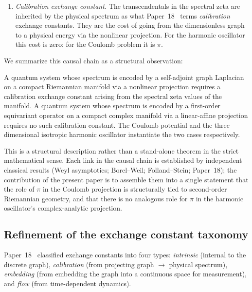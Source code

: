 \documentclass[twocolumn,pra,amsmath,amssymb,superscriptaddress]{revtex4-2}
\begin{document}
\begin{enumerate}
\item \emph{Calibration exchange constant.}  The transcendentals
  in the spectral zeta are inherited by the physical spectrum as
  what Paper~18~\cite{paper18} terms \emph{calibration} exchange
  constants.  They are the cost of going from the dimensionless
  graph to a physical energy via the nonlinear projection.  For
  the harmonic oscillator this cost is zero; for the Coulomb
  problem it is $\pi$.
\end{enumerate}

We summarize this causal chain as a structural observation:

\begin{theorem}
\label{thm:asymmetry}
A quantum system whose spectrum is encoded by a self-adjoint
graph Laplacian on a compact Riemannian manifold via a nonlinear
projection requires a calibration exchange constant arising from
the spectral zeta values of the manifold.  A quantum system
whose spectrum is encoded by a first-order equivariant operator
on a compact complex manifold via a linear-affine projection
requires no such calibration constant.  The Coulomb potential and
the three-dimensional isotropic harmonic oscillator instantiate
the two cases respectively.
\end{theorem}

This is a structural description rather than a stand-alone
theorem in the strict mathematical sense.  Each link in the
causal chain is established by independent classical results
(Weyl asymptotics; Borel--Weil; Folland--Stein; Paper~18); the
contribution of the present paper is to assemble them into a
single statement that the role of $\pi$ in the Coulomb projection
is structurally tied to second-order Riemannian geometry, and
that there is no analogous role for $\pi$ in the harmonic
oscillator's complex-analytic projection.

\subsection{Refinement of the exchange constant taxonomy}
\label{sec:taxonomy}

Paper~18~\cite{paper18} classified exchange constants into four
types: \emph{intrinsic} (internal to the discrete graph),
\emph{calibration} (from projecting graph $\to$ physical
spectrum), \emph{embedding} (from embedding the graph into a
continuous space for measurement), and \emph{flow} (from
time-dependent dynamics).
\end{document}
